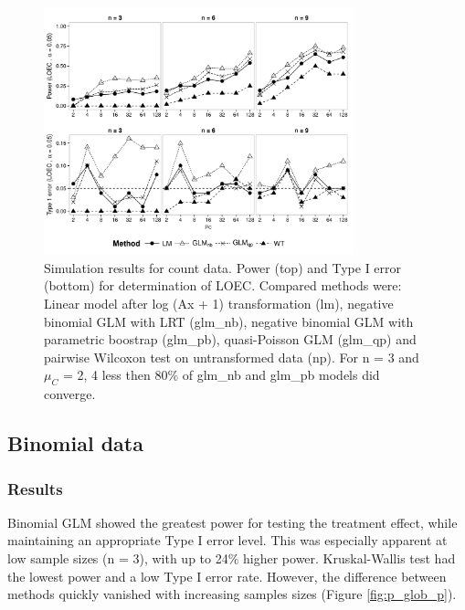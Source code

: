 \documentclass{scrartcl}
\begin{document}
\begin{figure}
  \centering
  \includegraphics[width = 0.8\textwidth]{p_loec_c.pdf}
  \caption{Simulation results for count data. Power (top) and Type I error (bottom) for determination of LOEC. Compared methods were: Linear model after log (Ax + 1) transformation (lm), negative binomial GLM with LRT (glm\_nb), negative binomial GLM with parametric boostrap (glm\_pb), quasi-Poisson GLM (glm\_qp) and pairwise Wilcoxon test on untransformed data (np). For n = 3 and $\mu_C$ = {2, 4} less then 80\% of glm\_nb and glm\_pb models did converge.}
  \label{fig:p_loec_c}
\end{figure}



\subsection{Binomial data}



\subsubsection{Results}
Binomial GLM showed the greatest power for testing the treatment effect, while maintaining an appropriate Type I error level.
This was especially apparent at low sample sizes (n = 3), with up to 24\% higher power.
Kruskal-Wallis test had the lowest power and a low Type I error rate.
However, the difference between methods quickly vanished with increasing samples sizes (Figure \ref{fig:p_glob_p}).
\end{document}
